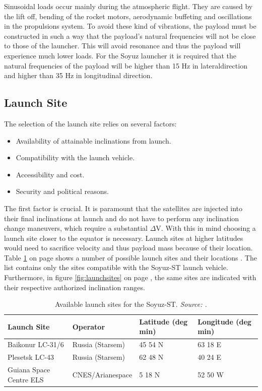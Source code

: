 Sinusoidal loads occur mainly during the atmospheric flight. They are caused by the lift off, bending of the rocket motors, aerodynamic buffeting and oscillations in the propulsions system. To avoid these kind of vibrations, the payload must be constructed in such a way that the payload's natural frequencies will not be close to those of the launcher. This will avoid resonance and thus the payload will experience much lower loads. For the Soyuz launcher it is required that the natural frequencies of the payload will be higher than 15 Hz in lateraldirection and higher than 35 Hz in longitudinal direction.  

\subsection{Launch Site}
\label{frLSLS}

The selection of the launch site relies on several factors:

\begin{itemize}
	\item Availability of attainable inclinations from launch.
	\item Compatibility with the launch vehicle.
	\item Accessibility and cost.
	\item Security and political reasons. 
\end{itemize}

The first factor is crucial. It is paramount that the satellites are injected into their final inclinations at launch and do not have to perform any inclination change maneuvers, which require a substantial $\Delta$V. With this in mind choosing a launch site closer to the equator is necessary. Launch sites at higher latitudes would need to sacrifice velocity and thus payload mass because of their location. Table \ref{table:launchtable} on page \pageref{table:launchtable} shows a number of possible launch sites and their locations \cite{larson}. The list contains only the sites compatible with the Soyuz-ST launch vehicle. Furthermore, in figure \ref{fig:launchsites} on page \pageref{fig:launchsites}, the same sites are indicated with their respective authorized inclination ranges.

\begin{table}[!h]
\begin{centering}
\begin{tabular}{llp{2cm}p{2cm}}
\toprule
Launch Site & Operator & Latitude (deg min) & Longitude (deg min) \\
\hline \hline
Baikonur LC-31/6  & Russia (Starsem) & 45 54 N & 63 18 E \\
Plesetsk LC-43  & Russia (Starsem)   &  62 48 N & 40 24 E \\
Guiana Space Centre  ELS  & CNES/Arianespace  & 5 18 N & 52 50 W \\
\bottomrule
\end{tabular}
\caption{Available launch sites for the Soyuz-ST.   \emph{Source: \cite{larson}.}}
\label{table:launchtable}
\end{centering}
\end{table}  

